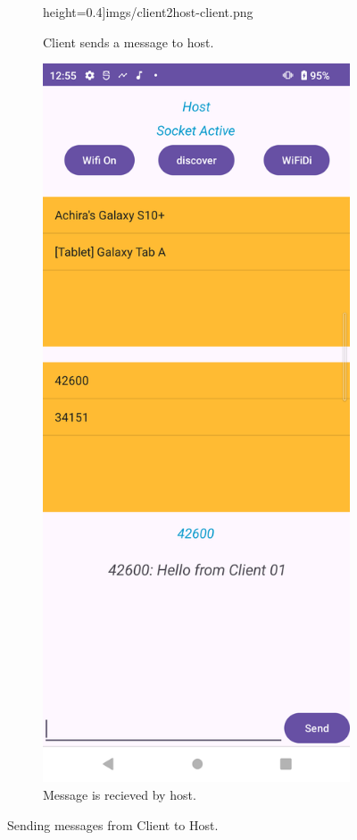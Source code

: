 \begin{figure}
\begin{subfigure}[b]{0.3\textwidth}
{                height=0.4\textheight]{imgs/client2host-client.png}}
        \caption{Client sends a message to host.}
        \label{clientComm:c}
    \end{subfigure}
    \hspace{1cm}
    \begin{subfigure}[b]{0.3\textwidth}
        \includegraphics[width=\textwidth,
            height=0.4\textheight]{imgs/client2host-host.png}
        \caption{Message is recieved by host.}
        \label{clientComm:h}
    \end{subfigure}
    \caption{Sending messages from Client to Host.}
    \label{clientComm}
\end{figure}

